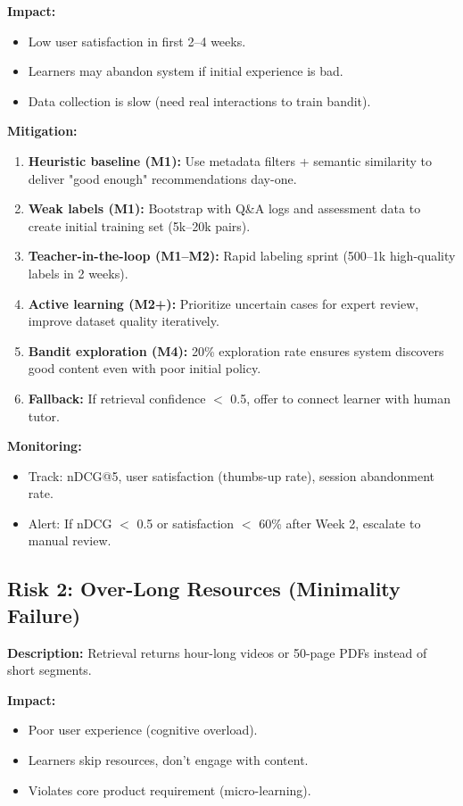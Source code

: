 \documentclass[11pt,letterpaper]{article}
\begin{document}
\textbf{Impact:}
\begin{itemize}
\item Low user satisfaction in first 2--4 weeks.
\item Learners may abandon system if initial experience is bad.
\item Data collection is slow (need real interactions to train bandit).
\end{itemize}

\textbf{Mitigation:}
\begin{enumerate}
\item \textbf{Heuristic baseline (M1):} Use metadata filters + semantic similarity to deliver "good enough" recommendations day-one.
\item \textbf{Weak labels (M1):} Bootstrap with Q\&A logs and assessment data to create initial training set (5k--20k pairs).
\item \textbf{Teacher-in-the-loop (M1--M2):} Rapid labeling sprint (500--1k high-quality labels in 2 weeks).
\item \textbf{Active learning (M2+):} Prioritize uncertain cases for expert review, improve dataset quality iteratively.
\item \textbf{Bandit exploration (M4):} 20\% exploration rate ensures system discovers good content even with poor initial policy.
\item \textbf{Fallback:} If retrieval confidence $<$ 0.5, offer to connect learner with human tutor.
\end{enumerate}

\textbf{Monitoring:}
\begin{itemize}
\item Track: nDCG@5, user satisfaction (thumbs-up rate), session abandonment rate.
\item Alert: If nDCG $<$ 0.5 or satisfaction $<$ 60\% after Week 2, escalate to manual review.
\end{itemize}

\subsection{Risk 2: Over-Long Resources (Minimality Failure)}\label{subsec:risk-2-over-long}

\textbf{Description:} Retrieval returns hour-long videos or 50-page PDFs instead of short segments.

\textbf{Impact:}
\begin{itemize}
\item Poor user experience (cognitive overload).
\item Learners skip resources, don't engage with content.
\item Violates core product requirement (micro-learning).
\end{itemize}
\end{document}
